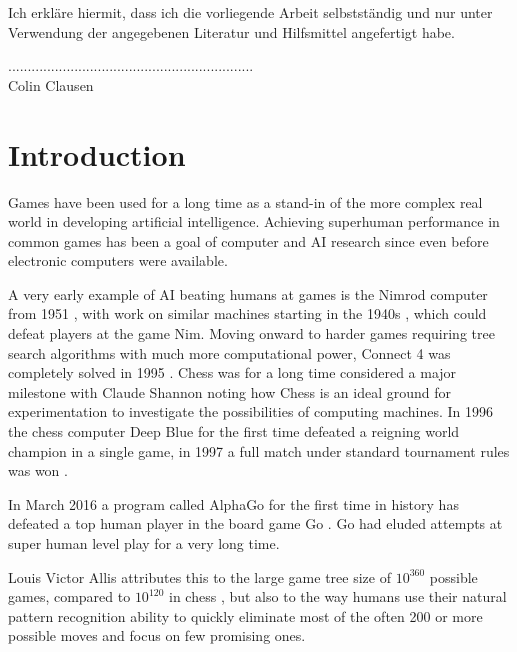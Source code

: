 \documentclass[12pt,onecolumn,oneside,titlepage]{article}
\begin{document}
\noindent Ich erkläre hiermit, dass ich die vorliegende Arbeit selbstständig und nur unter Verwendung der angegebenen Literatur und Hilfsmittel angefertigt habe.

\vspace{2cm}
\noindent ............................................................... \\
Colin Clausen

\thispagestyle{empty}

\pagebreak

\newpage\null\thispagestyle{empty}\newpage


\tableofcontents

\pagebreak



\section{Introduction}

Games have been used for a long time as a stand-in of the more complex real world in developing artificial intelligence. Achieving superhuman performance in common games has been a goal of computer and AI research since even before electronic computers were available.

A very early example of AI beating humans at games is the Nimrod computer from 1951 \cite{nimrod}, with work on similar machines starting in the 1940s \cite{nimmath}, which could defeat players at the game Nim.
Moving onward to harder games requiring tree search algorithms with much more computational power, Connect 4 was completely solved in 1995 \cite{trompsolved}.
Chess was for a long time considered a major milestone with Claude Shannon \cite{shannon1950xxii} noting how Chess is an ideal ground for experimentation to investigate the possibilities of computing machines.
In 1996 the chess computer Deep Blue for the first time defeated a reigning world champion in a single game, in 1997 a full match under standard tournament rules was won \cite{campbell2002deep}.

In March 2016 a program called AlphaGo for the first time in history has defeated a top human player in the board game Go \cite{leesedolVsAlphaGo}.
Go had eluded attempts at super human level play for a very long time.

Louis Victor Allis attributes \cite{allis1994searching} this to the large game tree size of $10^{360}$ possible games, compared to $10^{120}$ in chess \cite{shannon1950xxii},
but also to the way humans use their natural pattern recognition ability to quickly eliminate most of the often 200 or more possible moves and focus on few promising ones.
\end{document}
